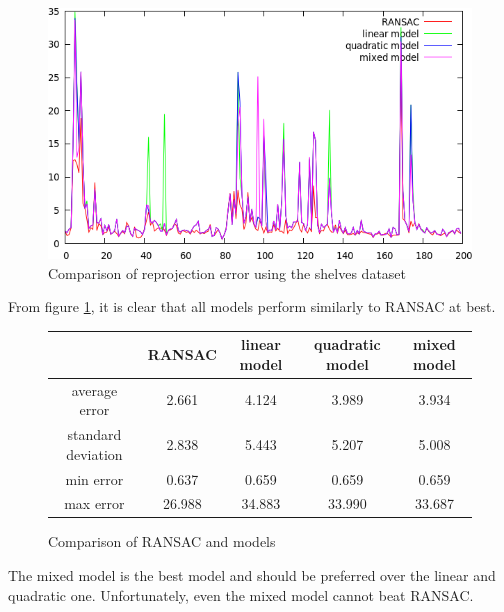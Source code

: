 \documentclass[11pt]{report}
\begin{document}
\begin{figure}[H]
    \centering
    \includegraphics[scale=0.5]{images/error-model.png}
    \caption{Comparison of reprojection error using the shelves dataset}
    \label{fig:error-model}
\end{figure}

From figure \ref{fig:error-model}, it is clear that all models perform similarly to RANSAC at best.

\begin{figure}[H]
\centering
\begin{tabular}{|c|c|c|c|c|}
\hline
& RANSAC & linear model & quadratic model & mixed model \\
\hline
average error & 2.661 & 4.124 & 3.989 & 3.934 \\
\hline
standard deviation & 2.838 & 5.443 & 5.207 & 5.008 \\
\hline
min error & 0.637 & 0.659 & 0.659 & 0.659 \\
\hline
max error & 26.988 & 34.883 & 33.990 & 33.687 \\
\hline
\end{tabular}
\caption{Comparison of RANSAC and models}
\end{figure}

The mixed model is the best model and should be preferred over the linear and quadratic one. Unfortunately, even the mixed model cannot beat RANSAC.
\end{document}
